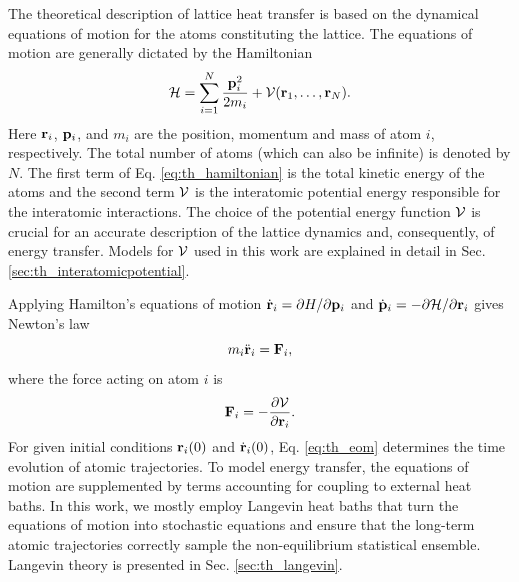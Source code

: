 The theoretical description of lattice heat transfer is based on the dynamical equations of motion for the atoms constituting the lattice. The equations of motion are generally dictated by the Hamiltonian \cite{ziman}
\begin{equation}
 \mathcal{H} = \sum_{i=1}^N \frac{\mathbf{p}_i^2}{2m_i} + \mathcal{V}(\mathbf{r}_1,\dots,\mathbf{r}_N). \label{eq:th_hamiltonian}
\end{equation}
Here $\mathbf{r}_i$, $\mathbf{p}_i$, and $m_i$ are the position, momentum and mass of atom $i$, respectively. The total number of atoms (which can also be infinite) is denoted by $N$. The first term of Eq. \eqref{eq:th_hamiltonian} is the total kinetic energy of the atoms and the second term $\mathcal{V}$ is the interatomic potential energy responsible for the interatomic interactions. The choice of the potential energy function $\mathcal{V}$ is crucial for an accurate description of the lattice dynamics and, consequently, of energy transfer. Models for $\mathcal{V}$ used in this work are explained in detail in Sec. \ref{sec:th_interatomicpotential}.

Applying Hamilton's equations of motion $\dot{\mathbf{r}}_i=\partial H/\partial \mathbf{p}_i$ and $\dot{\mathbf{p}}_i=-\partial \mathcal{H}/\partial \mathbf{r}_i$ \cite{fetter} gives Newton's law
\begin{equation}
 m_i \ddot{\mathbf{r}}_i = \mathbf{F}_i, \label{eq:th_eom}
\end{equation}
where the force acting on atom $i$ is
\begin{equation}
 \mathbf{F}_i = - \frac{\partial \mathcal{V}}{\partial \mathbf{r}_i}. \label{eq:th_force}
\end{equation}
For given initial conditions $\mathbf{r}_i(0)$ and $\dot{\mathbf{r}}_i(0)$, Eq. \eqref{eq:th_eom} determines the time evolution of atomic trajectories. To model energy transfer, the equations of motion are supplemented by terms accounting for coupling to external heat baths. In this work, we mostly employ Langevin heat baths that turn the equations of motion into stochastic equations and ensure that the long-term atomic trajectories correctly sample the non-equilibrium statistical ensemble. Langevin theory is presented in Sec. \ref{sec:th_langevin}.

